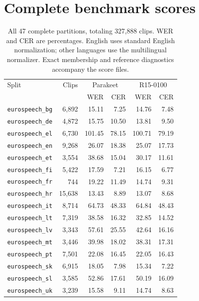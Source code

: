 \clearpage
\appendix
\section{Complete benchmark scores}
\begin{table}[!ht]
\centering
\caption{All 47 complete partitions, totaling 327,888 clips. WER and CER are percentages. English uses standard English normalization; other languages use the multilingual normalizer. Exact membership and reference diagnostics accompany the score files.}
\label{tab:full-benchmark}
\footnotesize
\setlength{\tabcolsep}{3.4pt}
\renewcommand{\arraystretch}{1.08}
\begin{tabular}{lrrrrr}
\toprule
Split & Clips & \multicolumn{2}{c}{Parakeet} & \multicolumn{2}{c}{R15-0100}\\
 & & WER & CER & WER & CER\\
\midrule
\texttt{eurospeech\_bg} & 6,892 & 15.11 & 7.25 & 14.76 & 7.48\\
\texttt{eurospeech\_de} & 4,872 & 15.75 & 10.50 & 13.81 & 9.50\\
\texttt{eurospeech\_el} & 6,730 & 101.45 & 78.15 & 100.71 & 79.19\\
\texttt{eurospeech\_en} & 9,268 & 26.07 & 18.38 & 25.07 & 17.73\\
\texttt{eurospeech\_et} & 3,554 & 38.68 & 15.04 & 30.17 & 11.61\\
\texttt{eurospeech\_fi} & 5,422 & 17.59 & 7.21 & 16.15 & 6.77\\
\texttt{eurospeech\_fr} & 744 & 19.22 & 11.49 & 14.74 & 9.31\\
\texttt{eurospeech\_hr} & 15,638 & 13.43 & 8.89 & 13.07 & 8.68\\
\texttt{eurospeech\_it} & 8,714 & 64.73 & 48.33 & 64.84 & 48.43\\
\texttt{eurospeech\_lt} & 7,319 & 38.58 & 16.32 & 32.85 & 14.52\\
\texttt{eurospeech\_lv} & 3,343 & 57.61 & 25.55 & 42.64 & 16.16\\
\texttt{eurospeech\_mt} & 3,446 & 39.98 & 18.02 & 38.31 & 17.31\\
\texttt{eurospeech\_pt} & 7,501 & 22.08 & 16.45 & 22.05 & 16.43\\
\texttt{eurospeech\_sk} & 6,915 & 18.05 & 7.98 & 15.34 & 7.22\\
\texttt{eurospeech\_sl} & 3,585 & 52.86 & 17.61 & 50.19 & 16.09\\
\texttt{eurospeech\_uk} & 3,239 & 15.58 & 9.11 & 14.74 & 8.63\\

\end{tabular}
\end{table}
